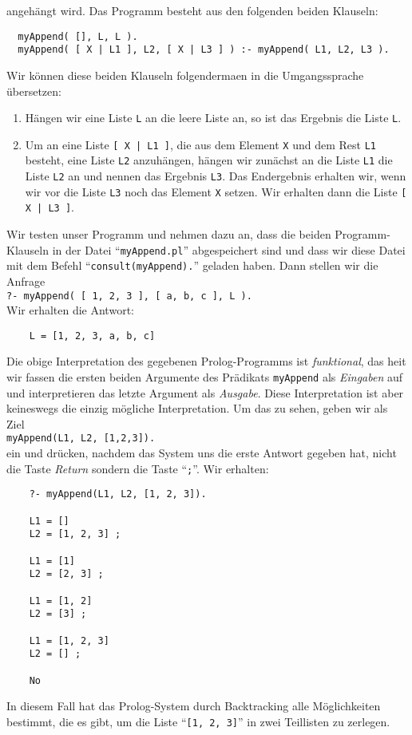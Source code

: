 angeh\"{a}ngt wird.  Das Programm besteht aus den folgenden beiden Klauseln:
\begin{verbatim}
  myAppend( [], L, L ).
  myAppend( [ X | L1 ], L2, [ X | L3 ] ) :- myAppend( L1, L2, L3 ).
\end{verbatim}
Wir k\"{o}nnen diese beiden Klauseln folgenderma\3en in die Umgangssprache \"{u}bersetzen:
\begin{enumerate}
\item H\"{a}ngen wir eine Liste \texttt{L} an die leere Liste an, so ist das Ergebnis die
      Liste \texttt{L}.
\item Um an eine Liste \texttt{[ X | L1 ]}, die aus dem Element \texttt{X} und dem Rest \texttt{L1} besteht,
      eine Liste \texttt{L2} anzuh\"{a}ngen, h\"{a}ngen wir zun\"{a}chst an die Liste \texttt{L1} die 
      Liste \texttt{L2} an und nennen das Ergebnis \texttt{L3}.  
      Das Endergebnis erhalten wir, wenn wir vor die Liste \texttt{L3} noch das Element \texttt{X}
      setzen.  Wir erhalten dann die Liste \texttt{[ X | L3 ]}.
\end{enumerate}
Wir testen unser Programm und nehmen dazu an, dass die beiden Programm-Klauseln in der Datei
``\texttt{myAppend.pl}'' abgespeichert sind und dass wir diese Datei mit dem Befehl ``\texttt{consult(myAppend).}'' geladen haben.
Dann stellen wir die Anfrage \\[0.2cm]
\hspace*{1.3cm} \texttt{?- myAppend( [ 1, 2, 3 ], [ a, b, c ], L ).} \\[0.2cm]
Wir erhalten die Antwort:
\begin{verbatim}
    L = [1, 2, 3, a, b, c] 
\end{verbatim}
Die obige Interpretation des gegebenen Prolog-Programms ist \emph{funktional}, das hei\3t 
wir fassen die ersten beiden Argumente des Pr\"{a}dikats \texttt{myAppend} als \emph{Eingaben} auf und 
interpretieren das letzte Argument als \emph{Ausgabe}.  Diese Interpretation ist aber keineswegs die 
einzig m\"{o}gliche Interpretation.  Um das zu sehen, geben wir als Ziel \\[0.2cm]
\hspace*{1.3cm} \texttt{myAppend(L1, L2, [1,2,3]).} \\[0.2cm]
ein und dr\"{u}cken, nachdem das System uns die erste Antwort gegeben hat, nicht die Taste 
\textsl{Return} sondern die Taste ``\texttt{;}''.  Wir erhalten:
\begin{verbatim}
    ?- myAppend(L1, L2, [1, 2, 3]).

    L1 = []
    L2 = [1, 2, 3] ;

    L1 = [1]
    L2 = [2, 3] ;

    L1 = [1, 2]
    L2 = [3] ;

    L1 = [1, 2, 3]
    L2 = [] ;

    No
\end{verbatim}
In diesem Fall hat das Prolog-System durch Backtracking  alle M\"{o}glichkeiten bestimmt, die
es gibt, um die Liste ``\texttt{[1, 2, 3]}'' in zwei Teillisten zu zerlegen.

